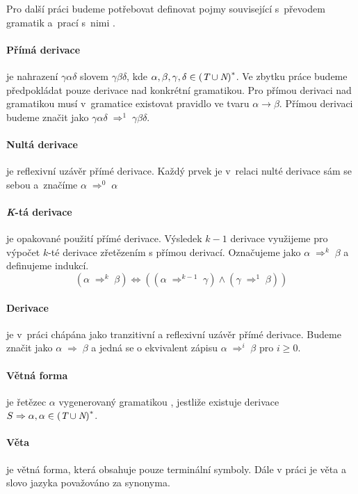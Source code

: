 		\vspace{1em}
		
		Pro další práci budeme potřebovat definovat pojmy související s~převodem gramatik a~prací s~nimi \cite{Meduna:2014:FLC:2636678}.
		
		\paragraph{Přímá derivace}
		je nahrazení $\gamma\alpha\delta$ slovem $\gamma\beta\delta$, kde 
		$\alpha,\beta,\gamma,\delta\in
			{(\textit{T}\cup\textit{N})}^{\ast}$.
		Ve zbytku práce budeme předpokládat pouze derivace nad konkrétní gramatikou. Pro přímou derivaci nad gramatikou musí v~gramatice existovat pravidlo ve tvaru $\alpha\rightarrow\beta$. Přímou derivaci budeme značit jako
		$\gamma\alpha\delta \;
			{\Rightarrow}^{1} 
		\; \gamma\beta\delta$.
		\paragraph{Nultá derivace}
		je reflexivní uzávěr přímé derivace. Každý prvek je v~relaci nulté derivace sám se sebou a~značíme 	
		$\alpha\;
			{\Rightarrow}^{0} 
		\; \alpha$
		\paragraph{\textit{K}-tá derivace}
		je opakované použití přímé derivace. Výsledek $k-1$ derivace využijeme pro výpočet $k$-té derivace zřetězením s přímou derivací. Označujeme jako 	
		$\alpha\;
			{\Rightarrow}^{k} 
		\; \beta$
		a definujeme indukcí.
		$$(\alpha\;
			{\Rightarrow}^{k} 
		\; \beta)
		\Leftrightarrow
		((\alpha\;
			{\Rightarrow}^{k-1} 
		\; \gamma)
		\wedge
		(\gamma\;
			{\Rightarrow}^{1} 
		\; \beta))$$
		\paragraph{Derivace}
		je v~práci chápána jako tranzitivní a reflexivní uzávěr přímé derivace. Budeme značit jako
		$\alpha\;
			{\Rightarrow}
		\; \beta$
		a jedná se o ekvivalent zápisu
		$\alpha\;
			{\Rightarrow}^{i} 
		\; \beta$
		pro $i\ge0$.
		\paragraph{Větná forma}
		je řetězec $\alpha$ vygenerovaný gramatikou \GrammarDef, jestli\-že existuje derivace $S\Rightarrow\alpha,\alpha\in{(\textit{T}\cup\textit{N})}^{\ast}$.
		\paragraph{Věta}
		je větná forma, která obsahuje pouze terminální symboly. Dále v práci je věta a slovo jazyka považováno za synonyma.

